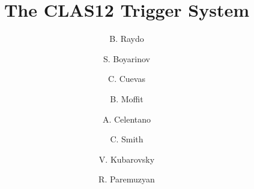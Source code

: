 \title{The CLAS12 Trigger System}

\author[A]{B. Raydo}
\author[A]{S. Boyarinov}
\author[A]{C. Cuevas}
\author[A]{B. Moffit}
\author[B]{A. Celentano}
\author[A]{C. Smith}
\author[A]{V. Kubarovsky}
\author[A]{R. Paremuzyan}

\address[A]{Thomas Jefferson National Accelerator Facility, Newport News, VA, USA}
\address[B]{INFN, Milan, Italy}
